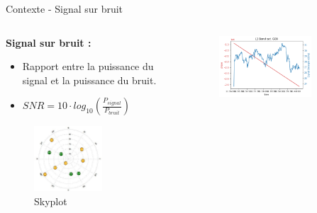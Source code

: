 \documentclass[xcolor=dvipsnames,envcountsect]{beamer}
\begin{document}
\begin{frame}{Contexte - Signal sur bruit}
	\begin{columns}
		\begin{column}{0.5\textwidth}
			\textbf{Signal sur bruit :} 
			\begin{itemize}
				\item Rapport entre la puissance du signal et la puissance du bruit.
				\item $SNR = 10 \cdot log_{10}(\frac{P_{signal}}{P_{bruit}})$
			\end{itemize}
			\begin{figure}
				\centering
				\includegraphics[width=0.6\textwidth]{./Figures/skyplot.jpg}
				\caption {Skyplot}
			\end{figure}
		\end{column}
		\begin{column}{0.5\textwidth}
			\begin{figure}
				\includegraphics[width=0.8\textwidth]{./Figures/G08_L1.png}

\end{figure}
\end{column}
\end{columns}
\end{frame}
\end{document}
